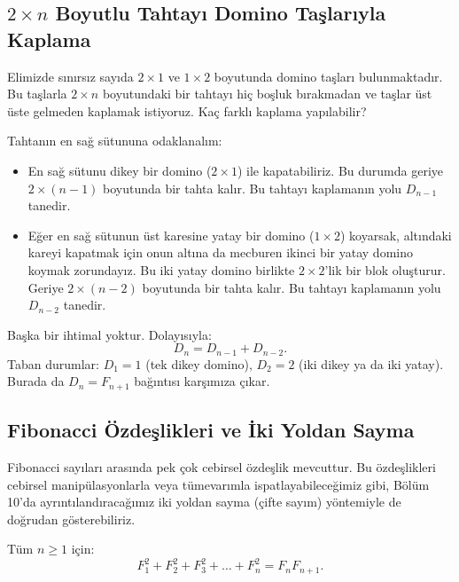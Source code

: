 \subsection{$2 \times n$ Boyutlu Tahtayı Domino Taşlarıyla Kaplama}

Elimizde sınırsız sayıda $2 \times 1$ ve $1 \times 2$ boyutunda domino taşları bulunmaktadır. Bu taşlarla $2 \times n$ boyutundaki bir tahtayı hiç boşluk bırakmadan ve taşlar üst üste gelmeden kaplamak istiyoruz. Kaç farklı kaplama yapılabilir?

Tahtanın en sağ sütununa odaklanalım:
\begin{itemize}
    \item En sağ sütunu dikey bir domino ($2 \times 1$) ile kapatabiliriz. Bu durumda geriye $2 \times (n-1)$ boyutunda bir tahta kalır. Bu tahtayı kaplamanın yolu $D_{n-1}$ tanedir.
    \item Eğer en sağ sütunun üst karesine yatay bir domino ($1 \times 2$) koyarsak, altındaki kareyi kapatmak için onun altına da mecburen ikinci bir yatay domino koymak zorundayız. Bu iki yatay domino birlikte $2 \times 2$'lik bir blok oluşturur. Geriye $2 \times (n-2)$ boyutunda bir tahta kalır. Bu tahtayı kaplamanın yolu $D_{n-2}$ tanedir.
\end{itemize}
Başka bir ihtimal yoktur. Dolayısıyla:
\[
D_n = D_{n-1} + D_{n-2}.
\]
Taban durumlar: $D_1 = 1$ (tek dikey domino), $D_2 = 2$ (iki dikey ya da iki yatay).
Burada da $D_n = F_{n+1}$ bağıntısı karşımıza çıkar.

\subsection{Fibonacci Özdeşlikleri ve İki Yoldan Sayma}

Fibonacci sayıları arasında pek çok cebirsel özdeşlik mevcuttur. Bu özdeşlikleri cebirsel manipülasyonlarla veya tümevarımla ispatlayabileceğimiz gibi, Bölüm 10'da ayrıntılandıracağımız iki yoldan sayma (çifte sayım) yöntemiyle de doğrudan gösterebiliriz.

\begin{theorem}
Tüm $n \ge 1$ için:
\[
F_1^2 + F_2^2 + F_3^2 + \dots + F_n^2 = F_n F_{n+1}.
\]
\end{theorem}

